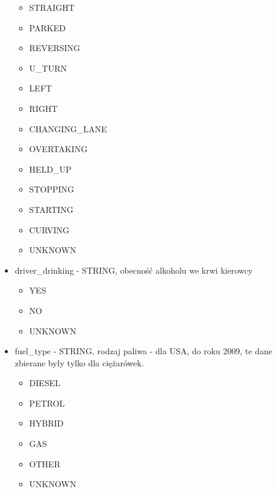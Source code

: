 \begin{itemize}
  \begin{itemize}
  \itemsep1pt\parskip0pt
  \item
    STRAIGHT\\
  \item
    PARKED\\
  \item
    REVERSING\\
  \item
    U\_TURN\\
  \item
    LEFT\\
  \item
    RIGHT\\
  \item
    CHANGING\_LANE\\
  \item
    OVERTAKING\\
  \item
    HELD\_UP\\
  \item
    STOPPING\\
  \item
    STARTING\\
  \item
    CURVING\\
  \item
    UNKNOWN\\
  \end{itemize}
\item
  driver\_drinking - STRING, obecność alkoholu we krwi kierowcy

  \begin{itemize}
  \itemsep1pt\parskip0pt
  \item
    YES\\
  \item
    NO\\
  \item
    UNKNOWN\\
  \end{itemize}
\item
  fuel\_type - STRING, rodzaj paliwa - dla USA, do roku 2009, te dane
  zbierane były tylko dla ciężarówek.

  \begin{itemize}
  \itemsep1pt\parskip0pt
  \item
    DIESEL\\
  \item
    PETROL\\
  \item
    HYBRID\\
  \item
    GAS\\
  \item
    OTHER\\
  \item
    UNKNOWN
  \end{itemize}
\end{itemize}

